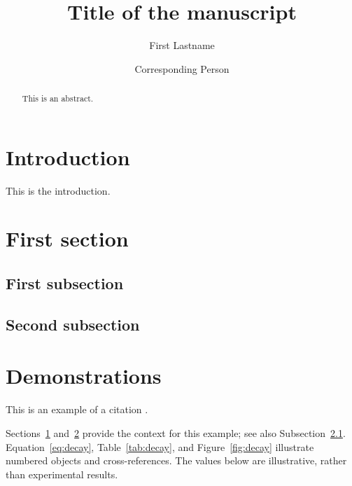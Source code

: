 \documentclass[10pt]{ijgtp}
\begin{document}

\title{Title of the manuscript}

\author{First Lastname}

\author{Corresponding Person}
\corresponding

\begin{abstract}
This is an abstract.
\lipsum[1-2]
\end{abstract}


\maketitle

\section{Introduction}
\label{sec:introduction}
This is the introduction.
\lipsum[1-5]

\section{First section}
\label{sec:first}

\subsection{First subsection}
\label{sec:first-subsection}

\lipsum[1-2]

\subsection{Second subsection}
\label{sec:second-subsection}

\lipsum[1-3]

\section{Demonstrations}
\label{sec:demo}
This is an example of a citation \cite{Konoplya:2025uta,Matyjasek:2026yiu}.

Sections~\ref{sec:introduction} and~\ref{sec:first} provide the context for this example; see also Subsection~\ref{sec:first-subsection}.
Equation~\eqref{eq:decay}, Table~\ref{tab:decay}, and Figure~\ref{fig:decay} illustrate numbered objects and cross-references. The values below are illustrative, rather than experimental results.
\end{document}
